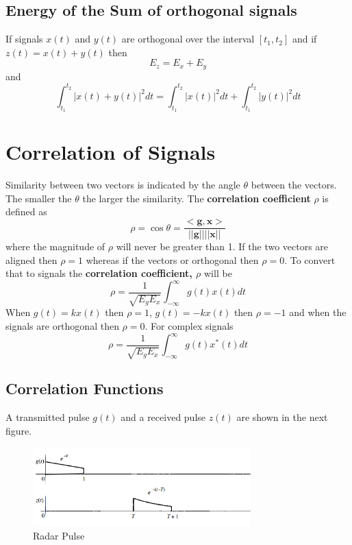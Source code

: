 \documentclass{article}
\begin{document}
    \subsection{Energy of the Sum of orthogonal signals}
    If signals $x(t)$ and $y(t)$ are orthogonal over the interval $[t_1, t_2]$ and if $z(t) = x(t) + y(t)$ then
    \begin{equation}
        E_z = E_x + E_y
    \end{equation}
    and 
    \begin{equation}
        \int_{t_1}^{t_2}|x(t) + y(t)|^2dt = \int_{t_1}^{t_2}|x(t)|^2dt + \int_{t_1}^{t_2}|y(t)|^2dt
    \end{equation}

    \section{Correlation of Signals}
    Similarity between two vectors is indicated by the angle $\theta$ between the vectors. The smaller the $\theta$ the larger the similarity. The \textbf{
    correlation coefficient} $\rho$ is defined as
    \begin{equation}
        \rho = \cos \theta = \frac{<\textbf{g}, \textbf{x}>}{||\textbf{g}|| ||\textbf{x}||}
    \end{equation}
    where the magnitude of $\rho$ will never be greater than 1. If the two vectors are aligned then $\rho = 1$ whereas if the vectors or orthogonal then 
    $\rho = 0$. To convert that to signals the \textbf{correlation coefficient, $\rho$} will be
    \begin{equation}
        \rho = \frac{1}{\sqrt{E_gE_x}}\int_{-\infty}^{\infty}g(t)x(t)dt
    \end{equation}
    When $g(t) = kx(t)$ then $\rho = 1$, $g(t) = -kx(t)$ then $\rho = -1$ and when the signals are orthogonal then $\rho = 0$. For complex signals
    \begin{equation}
        \rho = \frac{1}{\sqrt{E_gE_x}}\int_{-\infty}^{\infty}g(t)x^*(t)dt
    \end{equation}

    \subsection{Correlation Functions}
    A transmitted pulse $g(t)$ and a received pulse $z(t)$ are shown in the next figure. 

    \begin{figure}[h]
        \centering
        \includegraphics[width=0.75\textwidth]{corr}
        \caption{Radar Pulse}
    \end{figure}
\end{document}
